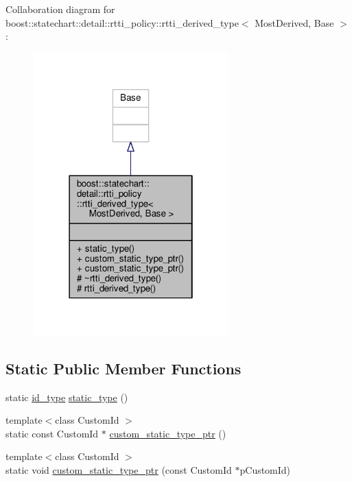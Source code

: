 Collaboration diagram for boost\+:\+:statechart\+:\+:detail\+:\+:rtti\+\_\+policy\+:\+:rtti\+\_\+derived\+\_\+type$<$ Most\+Derived, Base $>$\+:
\nopagebreak
\begin{figure}[H]
\begin{center}
\leavevmode
\includegraphics[width=214pt]{classboost_1_1statechart_1_1detail_1_1rtti__policy_1_1rtti__derived__type__coll__graph}
\end{center}
\end{figure}
\subsection*{Static Public Member Functions}
\begin{DoxyCompactItemize}
\item 
static \mbox{\hyperlink{structboost_1_1statechart_1_1detail_1_1rtti__policy_a57d56a3531686fb2b92d733b5da620c2}{id\+\_\+type}} \mbox{\hyperlink{classboost_1_1statechart_1_1detail_1_1rtti__policy_1_1rtti__derived__type_a0eddc3217e487ef7080cab0adae5bc80}{static\+\_\+type}} ()
\item 
{\footnotesize template$<$class Custom\+Id $>$ }\\static const Custom\+Id $\ast$ \mbox{\hyperlink{classboost_1_1statechart_1_1detail_1_1rtti__policy_1_1rtti__derived__type_aaadb177722b0dd8288bb0c2fad30f1fe}{custom\+\_\+static\+\_\+type\+\_\+ptr}} ()
\item 
{\footnotesize template$<$class Custom\+Id $>$ }\\static void \mbox{\hyperlink{classboost_1_1statechart_1_1detail_1_1rtti__policy_1_1rtti__derived__type_a7b6c26ef032d096d78207f3739f4890e}{custom\+\_\+static\+\_\+type\+\_\+ptr}} (const Custom\+Id $\ast$p\+Custom\+Id)
\end{DoxyCompactItemize}
